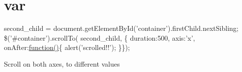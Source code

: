 \hypertarget{var-example}{\section{var}
}
second\-\_\-child = document.\-get\-Element\-By\-Id('container').first\-Child.\-next\-Sibling; \$('\#container').scroll\-To( second\-\_\-child, \{ duration\-:500, axis\-:'x', on\-After\-:\hyperlink{class_test_a51a683fa4fcec142ab1574e00a7b6860}{function()}\{ alert('scrolled!!'); \}\});

Scroll on both axes, to different values


\begin{DoxyCodeInclude}
\end{DoxyCodeInclude}
 